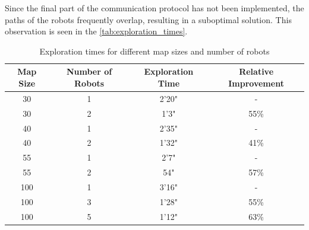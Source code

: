 \documentclass[../main.tex]{subfiles}
\begin{document}
Since the final part of the communication protocol has not been implemented, the paths of the robots frequently overlap, resulting in a suboptimal solution. This observation is seen in the \autoref{tab:exploration_times}.

\begin{table}[H]
	\centering
	\begin{tabular}{c c c c}
		\hline
		\textbf{Map Size} & \textbf{Number of Robots} & \textbf{Exploration Time} & \textbf{Relative Improvement} \\ \hline
		30 & 1 & 2'20" & - \\
		30 & 2 & 1'3" & 55\% \\
		40 & 1 & 2'35" & - \\
		40 & 2 & 1'32" & 41\% \\
		55 & 1 & 2'7" & - \\
		55 & 2 & 54" & 57\% \\
		100 & 1 & 3'16" & - \\
		100 & 3 & 1'28" & 55\% \\
		100 & 5 & 1'12" & 63\% \\
	\end{tabular}
	\caption{Exploration times for different map sizes and number of robots}
	\label{tab:exploration_times}
\end{table}
\end{document}

